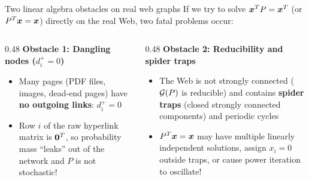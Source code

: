 \documentclass[aspectratio=169]{beamer}\usepackage[]{graphicx}\usepackage[]{xcolor}
\begin{document}
\begin{frame}{Two linear algebra obstacles on real web graphs}
If we try to solve $\bm{x}^T P = \bm{x}^T$ (or $P^T\bm{x} = \bm{x}$) directly on the real Web, two fatal problems occur:
\vfill
\begin{columns}[T]
\begin{column}{0.48\textwidth}
\textbf{Obstacle 1: Dangling nodes ($d_i^+ = 0$)}
\begin{itemize}
\item Many pages (PDF files, images, dead-end pages) have \textbf{no outgoing links}: $d_i^+ = 0$
\item Row $i$ of the raw hyperlink matrix is $\b0^T$, so probability mass ``leaks'' out of the network and $P$ is not stochastic!
\end{itemize}
\begin{center}
\end{center}
\end{column}
\begin{column}{0.48\textwidth}
\textbf{Obstacle 2: Reducibility and spider traps}
\begin{itemize}
\item The Web is not strongly connected ($\mathcal{G}(P)$ is reducible) and contains \textbf{spider traps} (closed strongly connected components) and periodic cycles
\item $P^T\bm{x} = \bm{x}$ may have multiple linearly independent solutions, assign $x_i = 0$ outside traps, or cause power iteration to oscillate!
\end{itemize}
\begin{center}
\end{center}
\end{column}
\end{columns}
\end{frame}
\end{document}
